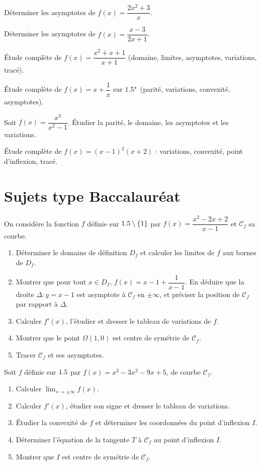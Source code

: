 \exo{} Déterminer les asymptotes de $f(x)=\dfrac{2x^{2}+3}{x}$.

\exo{} Déterminer les asymptotes de $f(x)=\dfrac{x-3}{2x+1}$.

\exo{} Étude complète de $f(x)=\dfrac{x^{2}+x+1}{x+1}$ (domaine, limites, asymptotes, variations, tracé).

\exo{} Étude complète de $f(x)=x+\dfrac{1}{x}$ sur $1.5^{*}$ (parité, variations, convexité, asymptotes).

\exo{} Soit $f(x)=\dfrac{x^{3}}{x^{2}-1}$. Étudier la parité, le domaine, les asymptotes et les variations.

\exo{} Étude complète de $f(x)=(x-1)^{2}(x+2)$ : variations, convexité, point d'inflexion, tracé.

\section{Sujets type Baccalauréat}

On considère la fonction $f$ définie sur $1.5\setminus\{1\}$ par
$f(x)=\dfrac{x^{2}-2x+2}{x-1}$ et $\mathcal C_f$ sa courbe.
\begin{enumerate}[label=\arabic*)]
\item Déterminer le domaine de définition $D_f$ et calculer les limites de $f$ aux bornes de $D_f$.
\item Montrer que pour tout $x\in D_f$, $f(x)=x-1+\dfrac{1}{x-1}$. En déduire que la droite
$\Delta:y=x-1$ est asymptote à $\mathcal C_f$ en $\pm\infty$, et préciser la position de $\mathcal C_f$ par rapport à $\Delta$.
\item Calculer $f'(x)$, l'étudier et dresser le tableau de variations de $f$.
\item Montrer que le point $\Omega(1,0)$ est centre de symétrie de $\mathcal C_f$.
\item Tracer $\mathcal C_f$ et ses asymptotes.
\end{enumerate}

Soit $f$ définie sur $1.5$ par $f(x)=x^{3}-3x^{2}-9x+5$, de courbe $\mathcal C_f$.
\begin{enumerate}[label=\arabic*)]
\item Calculer $\displaystyle\lim_{x\to\pm\infty}f(x)$.
\item Calculer $f'(x)$, étudier son signe et dresser le tableau de variations.
\item Étudier la convexité de $f$ et déterminer les coordonnées du point d'inflexion $I$.
\item Déterminer l'équation de la tangente $T$ à $\mathcal C_f$ au point d'inflexion $I$.
\item Montrer que $I$ est centre de symétrie de $\mathcal C_f$.
\end{enumerate}

